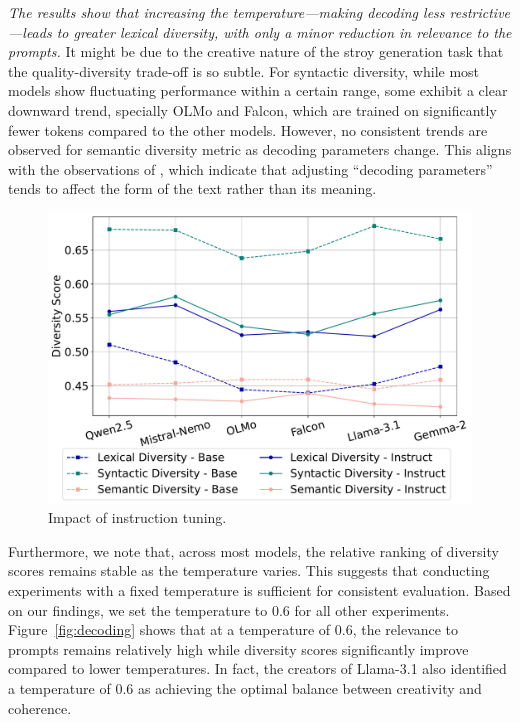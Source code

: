 \documentclass[11pt,a4paper]{article}
\begin{document}
\textit{The results show that increasing the temperature---making decoding less restrictive---leads to greater lexical diversity, with only a minor reduction in relevance to the prompts.} It might be due to the creative nature of the stroy generation task that the quality-diversity trade-off is so subtle. For syntactic diversity, while most models show fluctuating performance within a certain range, some exhibit a clear downward trend, specially OLMo and Falcon, which are trained on significantly fewer tokens compared to the other models. However, no consistent trends are observed for semantic diversity metric as decoding parameters change. This aligns with the observations of \citet{tevet-berant-2021-evaluating}, which indicate that adjusting ``decoding parameters'' tends to affect the form of the text rather than its meaning. 

\begin{figure}[t]
    \centering
    \includegraphics[width=0.9\columnwidth]{figures/base_instruct.pdf}
    \caption{Impact of instruction tuning.}
    \label{fig:base}
\end{figure}

Furthermore, we note that, across most models, the relative ranking of diversity scores remains stable as the temperature varies. This suggests that conducting experiments with a fixed temperature is sufficient for consistent evaluation. Based on our findings, we set the temperature to 0.6 for all other experiments. Figure~\ref{fig:decoding} shows that at a temperature of 0.6, the relevance to prompts remains relatively high while diversity scores significantly improve compared to lower temperatures. In fact, the creators of Llama-3.1 \citep{dubey2024llama} also identified a temperature of 0.6 as achieving the optimal balance between creativity and coherence.
\end{document}
